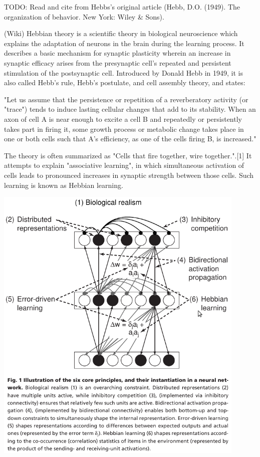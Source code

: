 TODO: Read and cite from Hebbs's original article (Hebb, D.O. (1949). The organization of behavior. New York: Wiley \& Sons). 

(Wiki) Hebbian theory is a scientific theory in biological neuroscience which explains the adaptation of neurons in the brain during the learning process. It describes a basic mechanism for synaptic plasticity wherein an increase in synaptic efficacy arises from the presynaptic cell's repeated and persistent stimulation of the postsynaptic cell. Introduced by Donald Hebb in 1949, it is also called Hebb's rule, Hebb's postulate, and cell assembly theory, and states:

    "Let us assume that the persistence or repetition of a reverberatory activity (or "trace") tends to induce lasting cellular changes that add to its stability. When an axon of cell A is near enough to excite a cell B and repeatedly or persistently takes part in firing it, some growth process or metabolic change takes place in one or both cells such that A's efficiency, as one of the cells firing B, is increased."

The theory is often summarized as "Cells that fire together, wire together.".[1] It attempts to explain "associative learning", in which simultaneous activation of cells leads to pronounced increases in synaptic strength between those cells. Such learning is known as Hebbian learning.

\includegraphics[width=12cm]{img/bio_plausability_o1998six.png}



